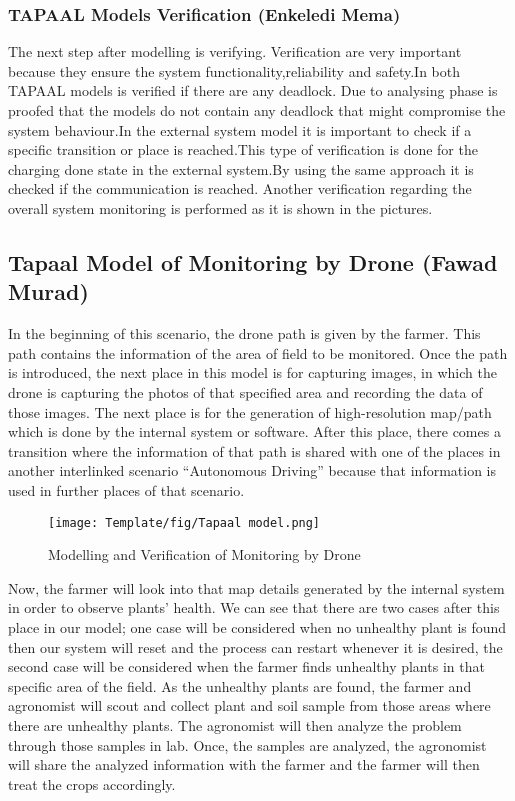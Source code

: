 \documentclass[english]{lni}
\begin{document}
\subsubsection{TAPAAL Models Verification (Enkeledi Mema) }
The next step after modelling is verifying. Verification are very important because they  ensure the system functionality,reliability and safety.In both TAPAAL models is verified if there are any deadlock. Due to analysing phase is proofed that the models do not contain any deadlock that might compromise the system behaviour.In the external system model it is important to check if a specific transition or place is reached.This type of verification is done for the charging done state in the external system.By using the same approach it is checked if the communication is reached. Another verification regarding the overall system monitoring is performed as it is shown in the pictures. 



\subsection{Tapaal Model of Monitoring by Drone  (Fawad Murad)}

In the beginning of this scenario, the drone path is given by the farmer. This path contains the information of the area of field to be monitored. Once the path is introduced, the next place in this model is for capturing images, in which the drone is capturing the photos of that specified area and recording the data of those images. The next place is for the generation of high-resolution map/path which is done by the internal system or software. After this place, there comes a transition where the information of that path is shared with one of the places in another interlinked scenario “Autonomous Driving” because that information is used in further places of that scenario.

\begin{figure}
    \texttt{[image: Template/fig/Tapaal model.png]}
    \centering
    \caption{Modelling and Verification of Monitoring by Drone}
\end{figure}

Now, the farmer will look into that map details generated by the internal system in order to observe plants’ health. We can see that there are two cases after this place in our model; one case will be considered when no unhealthy plant is found then our system will reset and the process can restart whenever it is desired, the second case will be considered when the farmer finds unhealthy plants in that specific area of the field. As the unhealthy plants are found, the farmer and agronomist will scout and collect plant and soil sample from those areas where there are unhealthy plants. The agronomist will then analyze the problem through those samples in lab. Once, the samples are analyzed, the agronomist will share the analyzed information with the farmer and the farmer will then treat the crops accordingly. 
\end{document}
